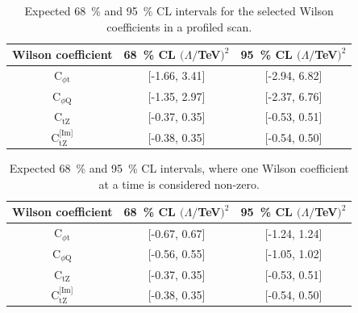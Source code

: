 \documentclass[letterpaper,11pt]{article}
\def\ctZ{C$_\text{tZ}$\xspace}
\def\ctZI{C$_\text{tZ}^\text{[Im]}$\xspace}
\def\cpt{C$_{\phi \text{t}}$\xspace}
\def\cpQM{C$_{\phi \text{Q}}$\xspace}
\def\TeV{TeV\xspace}
\begin{document}
\begin{table}[h]
\caption{Expected 68~\% and 95~\% CL intervals for the selected Wilson coefficients in a profiled scan.}\label{tab:proflimits}
\begin{center}
\begin{tabular}{c|c|c}
\hline
Wilson coefficient & 68~\% CL $(\Lambda/$\TeV$)^2$ & 95~\% CL $(\Lambda/$\TeV$)^2$ \\
\hline
\hline
\cpt   & [-1.66, 3.41]                 & [-2.94, 6.82]                 \\ 
\hline
\cpQM  & [-1.35, 2.97]                 & [-2.37, 6.76]                 \\ 
\hline
\ctZ   & [-0.37, 0.35]                 & [-0.53, 0.51]                 \\ 
\hline
\ctZI  & [-0.38, 0.35]                 & [-0.54, 0.50]                 \\ 
\hline
\end{tabular}
\end{center}
\end{table}

\begin{table}[h]
\caption{Expected 68~\% and 95~\% CL intervals, where one Wilson coefficient at a time is considered non-zero.}\label{tab:limits}
\begin{center}
\begin{tabular}{c|c|c}
\hline
Wilson coefficient & 68~\% CL $(\Lambda/$\TeV$)^2$ & 95~\% CL $(\Lambda/$\TeV$)^2$ \\
\hline
\hline
\cpt  & [-0.67, 0.67]                 & [-1.24, 1.24]                 \\
\hline
\cpQM & [-0.56, 0.55]                 & [-1.05, 1.02]                 \\
\hline
\ctZ  & [-0.37, 0.35]                 & [-0.53, 0.51]                 \\
\hline
\ctZI & [-0.38, 0.35]                 & [-0.54, 0.50]                 \\
\hline
\end{tabular}
\end{center}
\end{table}




\clearpage


\end{document}
